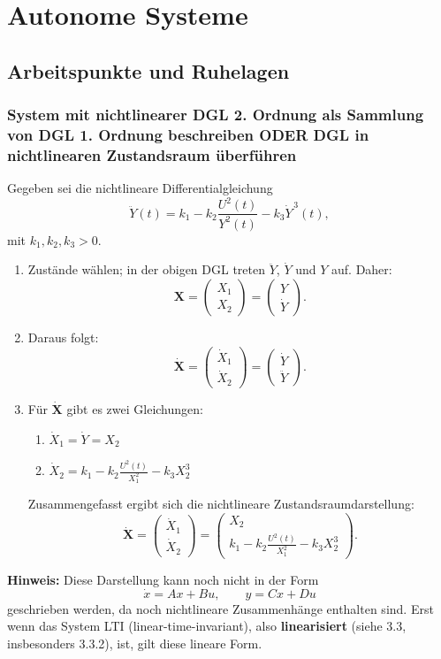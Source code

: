\documentclass[12pt]{article}
\begin{document}
\section{Autonome Systeme}
\subsection{Arbeitspunkte und Ruhelagen}
\subsubsection{System mit nichtlinearer DGL 2. Ordnung als Sammlung von DGL 1. Ordnung beschreiben ODER DGL in nichtlinearen Zustandsraum überführen}
\noindent Gegeben sei die nichtlineare Differentialgleichung
\[
\ddot{Y}(t)=k_1-k_2\frac{U^2(t)}{Y^2(t)}-k_3\dot{Y}^{\,3}(t),
\]
mit \(k_1,k_2,k_3>0\).
\begin{enumerate}[label=\arabic*.]
    \item Zustände wählen; in der obigen DGL treten \(\ddot{Y}\), \(\dot{Y}\) und \(Y\) auf. Daher:
    \[
    \mathbf{X}=
    \begin{pmatrix}
    X_1\\
    X_2
    \end{pmatrix}
    =
    \begin{pmatrix}
    Y\\
    \dot{Y}
    \end{pmatrix}.
    \]
    \item Daraus folgt:
    \[
    \dot{\mathbf{X}}=
    \begin{pmatrix}
    \dot{X}_1\\
    \dot{X}_2
    \end{pmatrix}
    =
    \begin{pmatrix}
    \dot{Y}\\
    \ddot{Y}
    \end{pmatrix}.
    \]
    \item Für \(\dot{\mathbf{X}}\) gibt es zwei Gleichungen:
    \begin{enumerate}[label=\arabic*.]
        \item \(\dot{X}_1=\dot{Y}=X_2\)
        \item \(\dot{X}_2=k_1-k_2\frac{U^2(t)}{X_1^2}-k_3X_2^3\)
    \end{enumerate}
    Zusammengefasst ergibt sich die nichtlineare Zustandsraumdarstellung:
    \[
    \dot{\mathbf{X}}=
    \begin{pmatrix}
    \dot{X}_1\\
    \dot{X}_2
    \end{pmatrix}
    =
    \begin{pmatrix}
    X_2\\
    k_1-k_2\frac{U^2(t)}{X_1^2}-k_3X_2^3
    \end{pmatrix}.
    \]
\end{enumerate}
    \noindent\textbf{Hinweis:} Diese Darstellung kann noch nicht in der Form
    \[
    \dot{x}=Ax+Bu,\qquad y=Cx+Du
    \]
    geschrieben werden, da noch nichtlineare Zusammenhänge enthalten sind. Erst wenn das System LTI (linear-time-invariant), also \textbf{linearisiert} (siehe 3.3, insbesonders 3.3.2), ist, gilt diese lineare Form.
\end{document}
